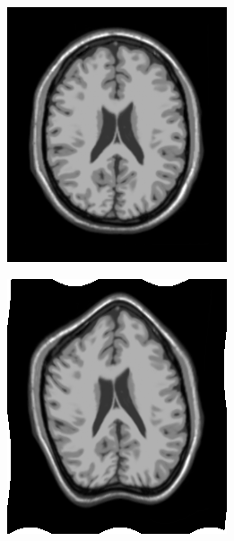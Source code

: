 \begin{figure}[h]
	\centering
	\begin{subfigure}[t]{0.23\textwidth}
	  \includegraphics[width=\textwidth]{figuras/screen.png}
	  \label{fig:ref-image}
	\end{subfigure}
	\begin{subfigure}[t]{0.23\textwidth}
	  \includegraphics[width=\textwidth]{figuras/movingImageSin.png}

\end{subfigure}
\end{figure}

